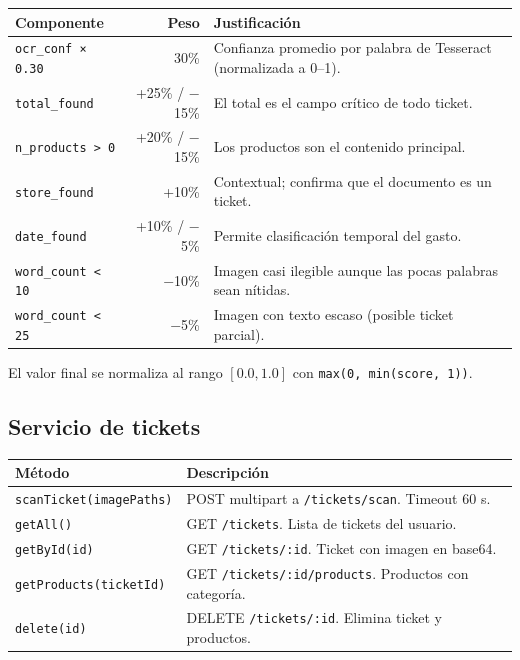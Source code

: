 \documentclass[12pt, letterpaper]{article}
\newcommand{\endpoint}[1]{\texttt{\small\color{azulipn}#1}}
\newcommand{\campo}[1]{\texttt{#1}}
\begin{document}
\begin{longtable}{lrp{6.5cm}}
  \toprule
  \textbf{Componente} & \textbf{Peso} & \textbf{Justificación} \\
  \midrule
  \endhead
  \campo{ocr\_conf × 0.30}  & 30\% &
    Confianza promedio por palabra de Tesseract (normalizada a 0--1). \\[3pt]
  \campo{total\_found}       & +25\% / $-$15\% &
    El total es el campo crítico de todo ticket. \\[3pt]
  \campo{n\_products > 0}    & +20\% / $-$15\% &
    Los productos son el contenido principal. \\[3pt]
  \campo{store\_found}       & +10\% &
    Contextual; confirma que el documento es un ticket. \\[3pt]
  \campo{date\_found}        & +10\% / $-$5\% &
    Permite clasificación temporal del gasto. \\[3pt]
  \campo{word\_count < 10}   & $-$10\% &
    Imagen casi ilegible aunque las pocas palabras sean nítidas. \\[3pt]
  \campo{word\_count < 25}   & $-$5\% &
    Imagen con texto escaso (posible ticket parcial). \\
  \bottomrule
\end{longtable}

El valor final se normaliza al rango $[0.0, 1.0]$ con \campo{max(0, min(score, 1))}.

\subsection{Servicio de tickets}

\begin{tabular}{lp{8cm}}
  \toprule
  \textbf{Método} & \textbf{Descripción} \\
  \midrule
  \campo{scanTicket(imagePaths)} &
    POST multipart a \endpoint{/tickets/scan}. Timeout 60 s. \\
  \campo{getAll()} &
    GET \endpoint{/tickets}. Lista de tickets del usuario. \\
  \campo{getById(id)} &
    GET \endpoint{/tickets/:id}. Ticket con imagen en base64. \\
  \campo{getProducts(ticketId)} &
    GET \endpoint{/tickets/:id/products}. Productos con categoría. \\
  \campo{delete(id)} &
    DELETE \endpoint{/tickets/:id}. Elimina ticket y productos. \\
  \bottomrule
\end{tabular}
\end{document}
